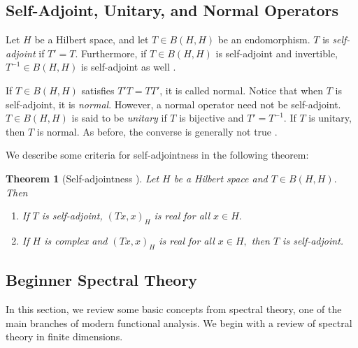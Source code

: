 \documentclass[12pt,a4paper]{article}
\theoremstyle{boldthm}
\newtheorem{theorem}{Theorem}[section]
\theoremstyle{bolddefn}
\begin{document}
    



\subsection{Self-Adjoint, Unitary, and Normal Operators}

Let $H$ be a Hilbert space, and let $T \in B(H, H)$ be an endomorphism. $T$ is \textit{self-adjoint} if $T' = T.$ Furthermore, if $T \in B(H, H)$ is self-adjoint and invertible, $T^{-1} \in B(H, H)$ is self-adjoint as well \cite{krey}. 


If $T \in B(H, H)$ satisfies $T'T = TT'$, it is called normal. Notice that when $T$ is self-adjoint, it is \textit{normal}. However, a normal operator need not be self-adjoint. $T \in B(H, H)$ is said to be \textit{unitary} if $T$ is bijective and $T' = T^{-1}.$ If $T$ is unitary, then  $T$ is normal. As before, the converse is generally not true \cite{krey}. 

We describe some criteria for self-adjointness in the following theorem:
\begin{theorem}[{Self-adjointness \cite[3.10-3]{krey}}] 
    Let $H$ be a Hilbert space and $T \in B(H, H).$ Then 
    \begin{enumerate}[label=(\alph*)]
        \item If $T$ is self-adjoint, $(Tx, x)_H$ is real for all $x \in H.$
        \item If $H$ is complex and $(Tx, x)_H$ is real for all $x \in H,$ then $T$ is self-adjoint.
    \end{enumerate}
\end{theorem}





\subsection{Beginner Spectral Theory}

In this section, we review some basic concepts from spectral theory, one of the main branches of modern functional analysis. We begin with a review of spectral theory in finite dimensions. 
\end{document}
